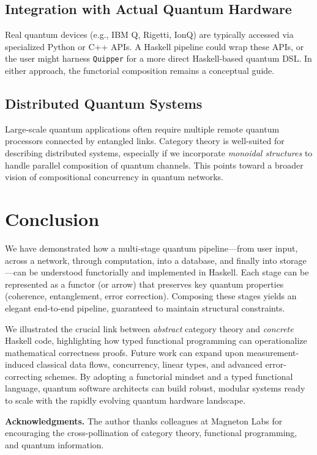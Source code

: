 \documentclass[12pt]{article}
\begin{document}
\subsection{Integration with Actual Quantum Hardware}
Real quantum devices (e.g., IBM Q, Rigetti, IonQ) are typically
accessed via specialized Python or C++ APIs. A Haskell pipeline
could wrap these APIs, or the user might harness \texttt{Quipper}
for a more direct Haskell-based quantum DSL. In either approach,
the functorial composition remains a conceptual guide.

\subsection{Distributed Quantum Systems}
Large-scale quantum applications often require multiple remote
quantum processors connected by entangled links. Category theory
is well-suited for describing distributed systems, especially if
we incorporate \emph{monoidal structures} to handle parallel
composition of quantum channels. This points toward a broader
vision of compositional concurrency in quantum networks.

\section{Conclusion}
We have demonstrated how a multi-stage quantum pipeline---from
user input, across a network, through computation, into a database,
and finally into storage---can be understood functorially and
implemented in Haskell. Each stage can be represented as a functor
(or arrow) that preserves key quantum properties (coherence,
entanglement, error correction). Composing these stages yields
an elegant end-to-end pipeline, guaranteed to maintain structural
constraints.

We illustrated the crucial link between \emph{abstract} category
theory and \emph{concrete} Haskell code, highlighting how typed
functional programming can operationalize mathematical correctness
proofs. Future work can expand upon measurement-induced classical
data flows, concurrency, linear types, and advanced error-correcting
schemes. By adopting a functorial mindset and a typed functional
language, quantum software architects can build robust, modular
systems ready to scale with the rapidly evolving quantum hardware
landscape.

\vspace{1em}

\noindent \textbf{Acknowledgments.} The author thanks colleagues at 
Magneton Labs for encouraging the cross-pollination of category 
theory, functional programming, and quantum information.  
\end{document}
